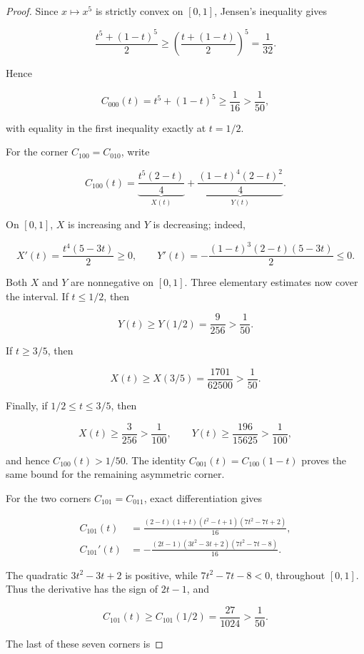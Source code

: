\documentclass[10pt,a4paper]{amsart}
\begin{document}
\begin{proof}
Since \(x\mapsto x^5\) is strictly convex on \([0,1]\), Jensen's inequality
gives

\[
\frac{t^5+(1-t)^5}{2}
\ge\left(\frac{t+(1-t)}2\right)^5
=\frac1{32}.
\]

Hence

\[
C_{000}(t)=t^5+(1-t)^5\ge\frac1{16}>\frac1{50},         \tag{4.1}
\]

with equality in the first inequality exactly at \(t=1/2\).

For the corner \(C_{100}=C_{010}\), write

\[
C_{100}(t)=
\underbrace{\frac{t^5(2-t)}4}_{X(t)}
+\underbrace{\frac{(1-t)^4(2-t)^2}{4}}_{Y(t)}.          \tag{4.2}
\]

On \([0,1]\), \(X\) is increasing and \(Y\) is decreasing; indeed,

\[
X'(t)=\frac{t^4(5-3t)}2\ge0,
\qquad
Y'(t)=-\frac{(1-t)^3(2-t)(5-3t)}2\le0.
\]

Both \(X\) and \(Y\) are nonnegative on \([0,1]\). Three elementary estimates
now cover the interval. If \(t\le1/2\), then

\[
Y(t)\ge Y(1/2)=\frac9{256}>\frac1{50}.
\]

If \(t\ge3/5\), then

\[
X(t)\ge X(3/5)=\frac{1701}{62500}>\frac1{50}.
\]

Finally, if \(1/2\le t\le3/5\), then

\[
X(t)\ge\frac3{256}>\frac1{100},
\qquad
Y(t)\ge\frac{196}{15625}>\frac1{100},
\]

and hence \(C_{100}(t)>1/50\). The identity
\(C_{001}(t)=C_{100}(1-t)\) proves the same bound for the remaining asymmetric
corner.

For the two corners \(C_{101}=C_{011}\), exact differentiation gives

\[
\begin{aligned}
C_{101}(t)
&=\frac{(2-t)(1+t)(t^2-t+1)(7t^2-7t+2)}{16},\\
C_{101}'(t)
&=-\frac{(2t-1)(3t^2-3t+2)(7t^2-7t-8)}{16}.
\end{aligned}                                             \tag{4.3}
\]

The quadratic \(3t^2-3t+2\) is positive, while
\(7t^2-7t-8<0\), throughout \([0,1]\). Thus the derivative has the sign of
\(2t-1\), and

\[
C_{101}(t)\ge C_{101}(1/2)=\frac{27}{1024}>\frac1{50}.
\]

The last of these seven corners is


\end{proof}
\end{document}
